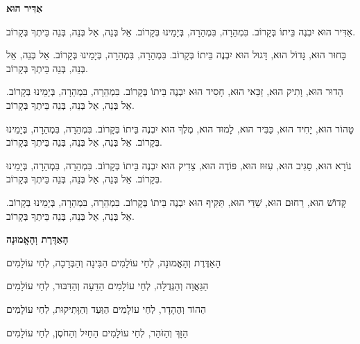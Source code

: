 \begin{center}
{\large \bfseries
אַדִּיר הוּא
}
\end{center}

אַדִּיר הוּא יִבְנֶה בֵּיתוֹ בְּקָרוֹב. בִּמְהֵרָה, בִּמְהֵרָה, בְּיָמֵינוּ בְּקָרוֹב. אֵל בְּנֵה, אֵל בְּנֵה, בְּנֵה בֵּיתְךָ בְּקָרוֹב.

\vspace{1em}

בָּחוּר הוּא, גָּדוֹל הוּא, דָּגוּל הוּא יִבְנֶה בֵּיתוֹ בְּקָרוֹב. בִּמְהֵרָה, בִּמְהֵרָה, בְּיָמֵינוּ בְּקָרוֹב. אֵל בְּנֵה, אֵל בְּנֵה, בְּנֵה בֵּיתְךָ בְּקָרוֹב.

\vspace{1em}

הָדוּר הוּא, וָתִיק הוּא, זַכַּאי הוּא, חָסִיד הוּא יִבְנֶה בֵּיתוֹ בְּקָרוֹב. בִּמְהֵרָה, בִּמְהֵרָה, בְּיָמֵינוּ בְּקָרוֹב. אֵל בְּנֵה, אֵל בְּנֵה, בְּנֵה בֵּיתְךָ בְּקָרוֹב.

\vspace{1em}

טָהוֹר הוּא, יָחִיד הוּא, כַּבִּיר הוּא, לָמוּד הוּא, מֶלֶךְ הוּא יִבְנֶה בֵּיתוֹ בְּקָרוֹב. בִּמְהֵרָה, בִּמְהֵרָה, בְּיָמֵינוּ בְּקָרוֹב. אֵל בְּנֵה, אֵל בְּנֵה, בְּנֵה בֵּיתְךָ בְּקָרוֹב.

\vspace{1em}

נוֹרָא הוּא, סַגִּיב הוּא, עִזּוּז הוּא, פּוֹדֶה הוּא, צַדִיק הוּא יִבְנֶה בֵּיתוֹ בְּקָרוֹב. בִּמְהֵרָה, בִּמְהֵרָה, בְּיָמֵינוּ בְּקָרוֹב. אֵל בְּנֵה, אֵל בְּנֵה, בְּנֵה בֵּיתְךָ בְּקָרוֹב.

\vspace{1em}

קָּדוֹשׁ הוּא, רַחוּם הוּא, שַׁדַּי הוּא, תַּקִּיף הוּא יִבְנֶה בֵּיתוֹ בְּקָרוֹב. בִּמְהֵרָה, בִּמְהֵרָה, בְּיָמֵינוּ בְּקָרוֹב. אֵל בְּנֵה, אֵל בְּנֵה, בְּנֵה בֵּיתְךָ בְּקָרוֹב.


\begin{center}
{\large \bfseries
הָאַדֶּרֶת וְהָאֱמוּנָה
}
\end{center}

הָאַדֶּרֶת וְהָאֱמוּנָה, לְחַי עוֹלָמִים
\hfill
הַבִּינָה וְהַבְּרָכָה, לְחַי עוֹלָמִים

הַגַּאֲוָה וְהַגְּדֻלָּה, לְחַי עוֹלָמִים
\hfill
הַדֵּעָה וְהַדִּבּוּר, לְחַי עוֹלָמִים

הַהוֹד וְהֶהָדָר, לְחַי עוֹלָמִים
\hfill
הַוַּעַד וְהַוָּתִיקוּת, לְחַי עוֹלָמִים

הַזָּךְ וְהַזֹּהַר, לְחַי עוֹלָמִים
\hfill
הַחַיִל וְהַחֹסֶן, לְחַי עוֹלָמִים


